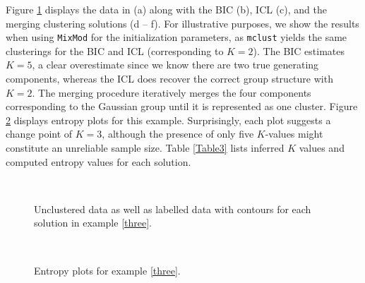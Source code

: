 \documentclass{uwstat572}
\renewcommand\;{\,}
\begin{document}
Figure \ref{Example3} displays the data in (a) along with the BIC (b), ICL (c), and the merging clustering solutions (d -- f).
For illustrative purposes, we show the results when using \texttt{MixMod} for the initialization parameters, as \texttt{mclust} yields the same clusterings for the BIC and ICL (corresponding to $K = 2$).
The BIC estimates $K = 5$, a clear overestimate since we know there are two true generating components, whereas the ICL does recover the correct group structure with $K = 2$.
The merging procedure iteratively merges the four components corresponding to the Gaussian group until it is represented as one cluster.
Figure \ref{Entropy3} displays entropy plots for this example.
Surprisingly, each plot suggests a change point of $K = 3$, although the presence of only five $K$-values might constitute an unreliable sample size.
Table \ref{Table3} lists inferred $K$ values and computed entropy values for each solution.

  
\begin{figure}
\begin{center}
\\ \vspace{-1em}
\end{center}
\caption{Unclustered data as well as labelled data with contours for each solution in example \ref{three}.}
\label{Example3}
\end{figure}

\begin{figure}
\begin{center}
\\ \vspace{-1em}
\end{center}
\caption{Entropy plots for example \ref{three}.}
\label{Entropy3}
\end{figure}
\end{document}
